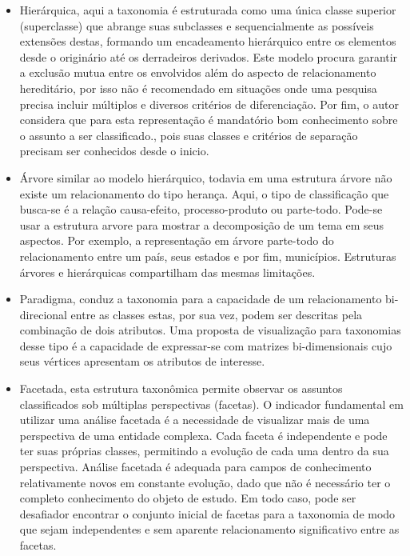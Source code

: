\begin{itemize}
\item Hierárquica, aqui a taxonomia é estruturada como uma única classe superior (superclasse) que abrange suas subclasses e sequencialmente as possíveis extensões destas, formando um encadeamento hierárquico entre os elementos desde o originário até os derradeiros derivados. Este modelo procura garantir a exclusão mutua entre os envolvidos além do aspecto de relacionamento hereditário, por isso não é recomendado em situações onde uma pesquisa precisa incluir múltiplos e diversos critérios de diferenciação. Por fim, o autor considera que para esta representação é mandatório bom conhecimento sobre o assunto a ser classificado., pois suas classes e critérios de separação precisam ser conhecidos desde o inicio.

\item Árvore similar ao modelo hierárquico, todavia em uma estrutura árvore não existe um relacionamento do tipo herança. Aqui, o tipo de classificação que busca-se é a relação causa-efeito, processo-produto ou parte-todo. Pode-se usar a estrutura arvore para mostrar a decomposição de um tema em seus aspectos. Por exemplo, a representação em árvore parte-todo do relacionamento entre um país, seus estados e por fim, municípios. Estruturas árvores e hierárquicas compartilham das mesmas limitações.

\item Paradigma, conduz a taxonomia para a capacidade de um relacionamento bi-direcional entre as classes estas, por sua vez, podem ser descritas pela combinação de dois atributos. Uma proposta de visualização para taxonomias desse tipo é a capacidade de expressar-se com matrizes bi-dimensionais cujo seus vértices apresentam os atributos de interesse.

\item Facetada, esta estrutura taxonômica permite observar os assuntos classificados sob múltiplas perspectivas (facetas). O indicador fundamental em utilizar uma análise facetada é a necessidade de visualizar mais de uma perspectiva de uma entidade complexa. Cada faceta é independente e pode ter suas próprias classes, permitindo a evolução de cada uma dentro da sua perspectiva. Análise facetada é adequada para campos de conhecimento relativamente novos em constante evolução, dado que não é necessário ter o completo conhecimento do objeto de estudo. Em todo caso, pode ser desafiador encontrar o conjunto inicial de facetas para a taxonomia de modo que sejam independentes e sem aparente relacionamento significativo entre as facetas.
\end{itemize}


